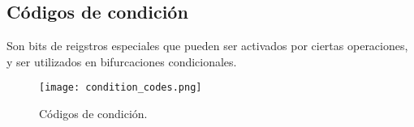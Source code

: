 \documentclass{article}
\begin{document}
\subsection*{C\'{o}digos de condici\'{o}n}
Son bits de reigstros especiales que pueden ser activados por ciertas
operaciones, y ser utilizados en bifurcaciones condicionales.

\begin{figure}[h]
    \centering
    \texttt{[image: condition\_codes.png]}
    \caption{C\'{o}digos de condici\'{o}n.
    \cite {stallings2006organización}}
\end{figure}



\end{document}
